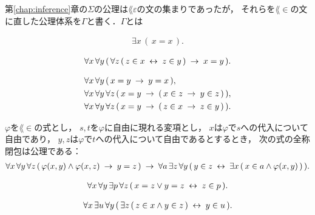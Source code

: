 	第\ref{chap:inference}章の$\Sigma$の公理は$\lang{\varepsilon}$の文の集まりであったが，
	それらを$\lang{\in}$の文に直した公理体系を$\Gamma$と書く．$\Gamma$とは
	\begin{description}
	\label{axioms_of_Gamma}
		\item[集合の存在]
			\begin{align}
				\exists x\, (\, x = x\, ).
			\end{align}
		
		\item[外延性]
			\begin{align}
				\forall x\, \forall y\, (\, \forall z\, 
				(\, z \in x \hspace{0.25em}\leftrightarrow\hspace{0.25em} z \in y\, ) \hspace{0.25em}\rightarrow\hspace{0.25em} x = y\, ).
			\end{align}
			
		\item[相等性] 
			\begin{align}
				&\forall x\, \forall y\, (\, x = y \hspace{0.25em}\rightarrow\hspace{0.25em} y = x\, ), \\
				&\forall x\, \forall y\, \forall z\, 
				(\, x = y \hspace{0.25em}\rightarrow\hspace{0.25em} (\, x \in z \hspace{0.25em}\rightarrow\hspace{0.25em} y \in z\, )\, ), \\
				&\forall x\, \forall y\, \forall z\, 
				(\, x = y \hspace{0.25em}\rightarrow\hspace{0.25em} (\, z \in x \hspace{0.25em}\rightarrow\hspace{0.25em} z \in y\, )\, ).
			\end{align}
		
		\item[置換] $\varphi$を$\lang{\in}$の式とし，
			$s,t$を$\varphi$に自由に現れる変項とし，
			$x$は$\varphi$で$s$への代入について自由であり，
			$y,z$は$\varphi$で$t$への代入について自由であるとするとき，
			次の式の全称閉包\footnotemark は公理である：
			\begin{align}
				\forall x\, \forall y\, \forall z\, 
				(\, \varphi(x,y) \wedge \varphi(x,z)
				\hspace{0.25em}\rightarrow\hspace{0.25em} y = z\, )
				\hspace{0.25em}\rightarrow\hspace{0.25em} \forall a\, \exists z\, \forall y\,
				(\, y \in z \hspace{0.25em}\leftrightarrow\hspace{0.25em} \exists x\, (\, x \in a \wedge 
				\varphi(x,y)\, )\, ).
			\end{align}
			
		\item[対] 
			\begin{align}
				\forall x\, \forall y\, \exists p\, \forall z\, 
				(\, x = z \vee y = z \hspace{0.25em}\leftrightarrow\hspace{0.25em} z \in p\, ).
			\end{align}
			
		\item[合併] 
			\begin{align}
				\forall x\, \exists u\, \forall y\, (\, \exists z\, (\, z \in x \wedge y \in z\, ) \hspace{0.25em}\leftrightarrow\hspace{0.25em} y \in u\, ).
			\end{align}
			

\end{description}
